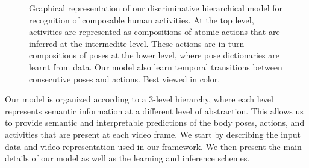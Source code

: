\begin{figure}[tb]
\begin{center}
\fbox{\rule{0pt}{2in} \rule{0.9\linewidth}{0pt}}
\end{center}
   \caption{Graphical representation of our discriminative hierarchical model for recognition of composable human activities.
At the top level, activities are represented as compositions of atomic actions that are inferred at
the intermedite level. These actions are in turn compositions of poses at the
lower level, where pose dictionaries are learnt from data. Our model also learn
temporal transitions between consecutive poses and actions. Best viewed in
color.}
\label{fig:overview}
\end{figure}
Our model is organized according to a 3-level hierarchy, where each level represents semantic 
information at a different level of abstraction. This allows us to provide semantic and 
interpretable predictions of the body poses, actions, and activities that are present at each video 
frame. We start by describing the input data and video representation used in our framework. We then 
present the main details of our model as well as the learning and inference schemes.


%




